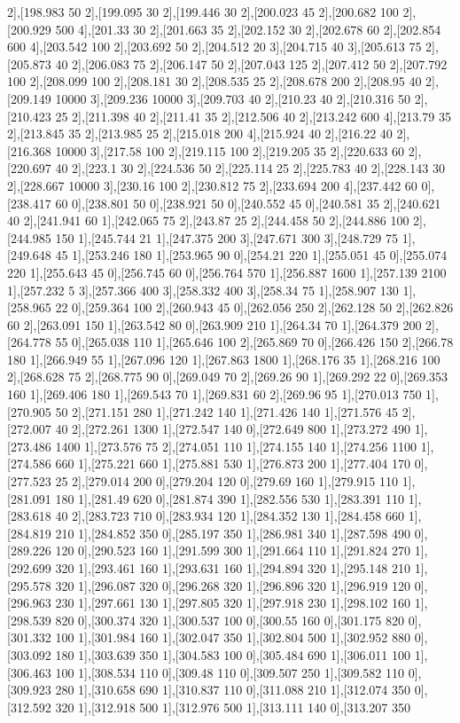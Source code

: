 {2],[198.983 50 2],[199.095 30 2],[199.446 30 2],[200.023 45 2],[200.682 100 2],[200.929 500 4],[201.33 30 2],[201.663 35 2],[202.152 30 2],[202.678 60 2],[202.854 600 4],[203.542 100 2],[203.692 50 2],[204.512 20 3],[204.715 40 3],[205.613 75 2],[205.873 40 2],[206.083 75 2],[206.147 50 2],[207.043 125 2],[207.412 50 2],[207.792 100 2],[208.099 100 2],[208.181 30 2],[208.535 25 2],[208.678 200 2],[208.95 40 2],[209.149 10000 3],[209.236 10000 3],[209.703 40 2],[210.23 40 2],[210.316 50 2],[210.423 25 2],[211.398 40 2],[211.41 35 2],[212.506 40 2],[213.242 600 4],[213.79 35 2],[213.845 35 2],[213.985 25 2],[215.018 200 4],[215.924 40 2],[216.22 40 2],[216.368 10000 3],[217.58 100 2],[219.115 100 2],[219.205 35 2],[220.633 60 2],[220.697 40 2],[223.1 30 2],[224.536 50 2],[225.114 25 2],[225.783 40 2],[228.143 30 2],[228.667 10000 3],[230.16 100 2],[230.812 75 2],[233.694 200 4],[237.442 60 0],[238.417 60 0],[238.801 50 0],[238.921 50 0],[240.552 45 0],[240.581 35 2],[240.621 40 2],[241.941 60 1],[242.065 75 2],[243.87 25 2],[244.458 50 2],[244.886 100 2],[244.985 150 1],[245.744 21 1],[247.375 200 3],[247.671 300 3],[248.729 75 1],[249.648 45 1],[253.246 180 1],[253.965 90 0],[254.21 220 1],[255.051 45 0],[255.074 220 1],[255.643 45 0],[256.745 60 0],[256.764 570 1],[256.887 1600 1],[257.139 2100 1],[257.232 5 3],[257.366 400 3],[258.332 400 3],[258.34 75 1],[258.907 130 1],[258.965 22 0],[259.364 100 2],[260.943 45 0],[262.056 250 2],[262.128 50 2],[262.826 60 2],[263.091 150 1],[263.542 80 0],[263.909 210 1],[264.34 70 1],[264.379 200 2],[264.778 55 0],[265.038 110 1],[265.646 100 2],[265.869 70 0],[266.426 150 2],[266.78 180 1],[266.949 55 1],[267.096 120 1],[267.863 1800 1],[268.176 35 1],[268.216 100 2],[268.628 75 2],[268.775 90 0],[269.049 70 2],[269.26 90 1],[269.292 22 0],[269.353 160 1],[269.406 180 1],[269.543 70 1],[269.831 60 2],[269.96 95 1],[270.013 750 1],[270.905 50 2],[271.151 280 1],[271.242 140 1],[271.426 140 1],[271.576 45 2],[272.007 40 2],[272.261 1300 1],[272.547 140 0],[272.649 800 1],[273.272 490 1],[273.486 1400 1],[273.576 75 2],[274.051 110 1],[274.155 140 1],[274.256 1100 1],[274.586 660 1],[275.221 660 1],[275.881 530 1],[276.873 200 1],[277.404 170 0],[277.523 25 2],[279.014 200 0],[279.204 120 0],[279.69 160 1],[279.915 110 1],[281.091 180 1],[281.49 620 0],[281.874 390 1],[282.556 530 1],[283.391 110 1],[283.618 40 2],[283.723 710 0],[283.934 120 1],[284.352 130 1],[284.458 660 1],[284.819 210 1],[284.852 350 0],[285.197 350 1],[286.981 340 1],[287.598 490 0],[289.226 120 0],[290.523 160 1],[291.599 300 1],[291.664 110 1],[291.824 270 1],[292.699 320 1],[293.461 160 1],[293.631 160 1],[294.894 320 1],[295.148 210 1],[295.578 320 1],[296.087 320 0],[296.268 320 1],[296.896 320 1],[296.919 120 0],[296.963 230 1],[297.661 130 1],[297.805 320 1],[297.918 230 1],[298.102 160 1],[298.539 820 0],[300.374 320 1],[300.537 100 0],[300.55 160 0],[301.175 820 0],[301.332 100 1],[301.984 160 1],[302.047 350 1],[302.804 500 1],[302.952 880 0],[303.092 180 1],[303.639 350 1],[304.583 100 0],[305.484 690 1],[306.011 100 1],[306.463 100 1],[308.534 110 0],[309.48 110 0],[309.507 250 1],[309.582 110 0],[309.923 280 1],[310.658 690 1],[310.837 110 0],[311.088 210 1],[312.074 350 0],[312.592 320 1],[312.918 500 1],[312.976 500 1],[313.111 140 0],[313.207 350 }
